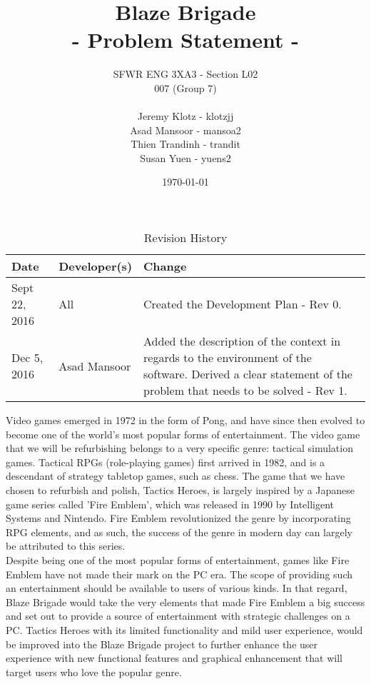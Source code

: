 \documentclass{article}
\title{%
	\vspace{40mm}
	\textbf {
	\Huge {\color[rgb]{0.9,0,0}Blaze} Brigade \\
	\large - Problem Statement -}}
\date{\today}
\author{SFWR ENG 3XA3 - Section L02 \\
	007 (Group 7) \\ \\
	Jeremy Klotz - klotzjj \\
	Asad Mansoor - mansoa2 \\
	Thien Trandinh - trandit \\
	Susan Yuen - yuens2}
\begin{document}
\maketitle
{}
\newpage
{}

\begin{table}[hp]
    \caption{Revision History} \label{TblRevisionHistory}
    \begin{tabularx}{\textwidth}{llX}
        \toprule
        \textbf{Date} & \textbf{Developer(s)} & \textbf{Change}\\
        \midrule
        Sept 22, 2016 & All & Created the Development Plan - Rev 0. \\
        Dec 5, 2016 & Asad Mansoor & Added the description of the context in regards to the environment of the software. Derived a clear statement of the problem that needs to be solved - Rev 1. \\
        \bottomrule
    \end{tabularx}
\end{table}

\newpage

Video games emerged in 1972 in the form of Pong, and have since then evolved to become one of the world's most popular forms of entertainment. The video game that we will be refurbishing belongs to a very specific genre: tactical simulation games. Tactical RPGs (role-playing games) first arrived in 1982, and is a descendant of strategy tabletop games, such as chess. The game that we have chosen to refurbish and polish, Tactics Heroes, is largely inspired by a Japanese game series called 'Fire Emblem', which was released in 1990 by Intelligent Systems and Nintendo. Fire Emblem revolutionized the genre by incorporating RPG elements, and as such, the success of the genre in modern day can largely be attributed to this series. \\

Despite being one of the most popular forms of entertainment, games like Fire Emblem have not made their mark on the PC era. The scope of providing such an entertainment should be available to users of various kinds. In that regard, Blaze Brigade would take the very elements that made Fire Emblem a big success and set out to provide a source of entertainment with strategic challenges on a PC. Tactics Heroes with its limited functionality and mild user experience, would be improved into the Blaze Brigade project to further enhance the user experience with new functional features and graphical enhancement that will target users who love the popular genre.\\
\end{document}
